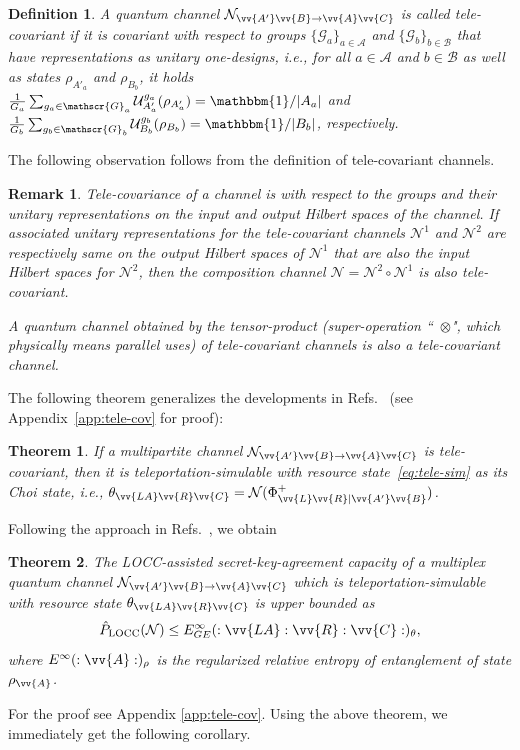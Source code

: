 \documentclass[aps,pra,twocolumn,superscriptaddress,longbibliography]{revtex4-1}
\def\LOCC{\operatorname{LOCC}}
\newcommand{\mc}[1]{\mathcal{#1}}
\newcommand{\msc}[1]{\mathscr{#1}}
\newcommand{\bbm}[1]{\mathbbm{#1}}
\newtheorem{theorem}{Theorem}
\newtheorem{definition}{Definition}
\newtheorem{remark}{Remark}
\begin{document}
\begin{definition}\label{def:tele-cov}
A quantum channel $\mc{N}_{\vv{A'}\vv{B}\to\vv{A}\vv{C}}$ is called tele-covariant if it is covariant with respect to groups $\{\msc{G}_a\}_{a\in\msc{A}}$ and $\{\msc{G}_b\}_{b\in\msc{B}}$ that have representations as unitary one-designs, i.e., for all $a\in\msc{A}$ and $b\in\msc{B}$ as well as states $\rho_{A'_a}$ and $\rho_{B_b}$, it holds $\frac{1}{G_a}\sum_{g_a\in\msc{G}_a}\mathcal{U}_{A'_a}^{g_a}(\rho_{A'_a})=\bbm{1}/|A_a|$ and $\frac{1}{G_b}\sum_{g_b\in\msc{G}_b}\mathcal{U}_{B_b}^{g_b}(\rho_{B_b})=\bbm{1}/|B_b|$, respectively.
\end{definition}

The following observation follows from the definition of tele-covariant channels. 
\begin{remark}\label{rem:comp}
Tele-covariance of a channel is with respect to the groups and their unitary representations on the input and output Hilbert spaces of the channel. If associated unitary representations for the tele-covariant channels $\mc{N}^1$ and $\mc{N}^2$ are respectively same on the output Hilbert spaces of $\mc{N}^1$ that are also the input Hilbert spaces for $\mc{N}^2$, then the composition channel $\mc{N}=\mc{N}^2\circ\mc{N}^1$ is also tele-covariant. 

A quantum channel obtained by the tensor-product (super-operation ``~$\otimes$", which physically means parallel uses) of tele-covariant channels is also a tele-covariant channel.
\end{remark}

The following theorem generalizes the developments in Refs.~\cite{GC99,CDKL01,DBB08,DBW17} (see Appendix~\ref{app:tele-cov} for proof):
\begin{theorem}\label{thm:bicov}
If a multipartite channel $\mc{N}_{\vv{A'}\vv{B}\to\vv{A}\vv{C}}$
is tele-covariant, then it is teleportation-simulable with resource state~\eqref{eq:tele-sim} as its Choi state, i.e., $\theta_{\vv{LA}\vv{R}\vv{C}}=\mc{N}(\Phi^+_{\vv{L}\vv{R}|\vv{A'}\vv{B}})$. 
\end{theorem}


Following the approach in Refs.~\cite{PLOB15,HHHO09}, we obtain

\begin{theorem}\label{theo:telecov-weakconv-GE}
The LOCC-assisted secret-key-agreement capacity of a multiplex quantum channel $\mc{N}_{\vv{A'}\vv{B}\to\vv{A}\vv{C}}$ which is teleportation-simulable with resource state $\theta_{\vv{LA}\vv{R}\vv{C}}$ is upper bounded as 
\begin{equation}
\hat{P}_{\LOCC}(\mc{N})\leq E^{\infty}_{GE}(:\vv{LA}:\vv{R}:\vv{C}:)_{\theta}, 
\end{equation}
where $E^\infty(:\vv{A}:)_{\rho}$ is the regularized relative entropy of entanglement of state $\rho_{\vv{A}}$.
\end{theorem}
For the proof see Appendix \ref{app:tele-cov}. Using the above theorem, we immediately get the following corollary.
\end{document}
